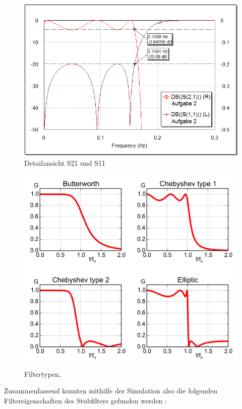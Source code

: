 \begin{figure}[h!]
\centering
 	\includegraphics[width=\imagewidth]{images/graph-LC.png}
 	\caption{Detailansicht S21 und S11}
 	\label{fig:graph-LC}
\end{figure}

\begin{figure}[h!]
\centering
 	\includegraphics[width=\imagewidth]{images/filtertypes.png}
 	\caption{Filtertypen, \cite{ref:wikipedia:chebyshev}}
 	\label{fig:filtertypes.png}
\end{figure}

Zusammenfassend konnten mithilfe der Simulation also die folgenden Filtereigenschaften des Stubfilters gefunden werden : 

